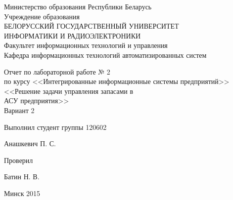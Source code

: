 \thispagestyle{empty}
\setlength{\parindent}{0ex} %

\begin{center}
  Министерство образования Республики Беларусь \\
  \vspace{0.5ex}
  Учреждение образования \\
  БЕЛОРУССКИЙ ГОСУДАРСТВЕННЫЙ УНИВЕРСИТЕТ \\
  ИНФОРМАТИКИ И РАДИОЭЛЕКТРОНИКИ \\
  \vspace{0.5ex}
  Факультет информационных технологий и управления \\
  \vspace{0.5ex}
  Кафедра информационных технологий автоматизированных систем
\end{center}

\vspace{50mm}

\begin{center}
  Отчет по лабораторной работе № 2 \\
  по курсу <<Интегрированные информационные системы предприятий>> \\
  <<Решение задачи управления запасами в \\
  АСУ предприятия>> \\
  Вариант 2
\end{center}

\vspace{40mm}

\begin{minipage}{.55\linewidth}
    Выполнил студент группы 120602
\end{minipage}
\hfill
\begin{minipage}{.4\linewidth}
  \begin{flushright}
    Анашкевич П. С.
  \end{flushright}
\end{minipage}

\begin{minipage}{.55\linewidth}
    Проверил
\end{minipage}
\hfill
\begin{minipage}{.4\linewidth}
  \begin{flushright}
    Батин Н. В.
  \end{flushright}
\end{minipage}

\vspace{50mm}
\begin{center}
  Минск 2015
\end{center}

\setlength{\parindent}{5ex} %

\newpage
